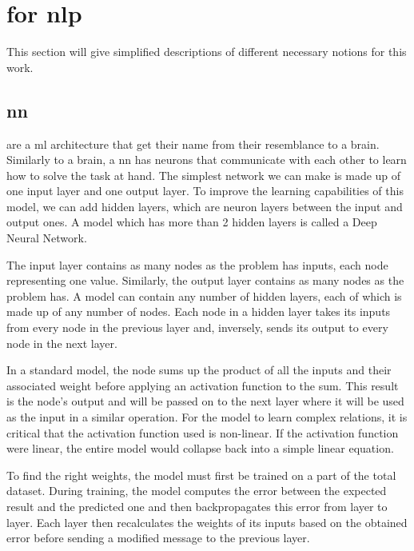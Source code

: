 \documentclass[../Document.tex]{subfiles}
\begin{document}
\section{ for \acrlong{nlp}}
\label{sec:intro/nlp}

This section will give simplified descriptions of different necessary notions for this work.


\subsection{\acrlong{nn}}

 are a \acrlong{ml} architecture that get their name from their resemblance to a brain. Similarly to a brain, a \gls{nn} has neurons that communicate with each other to learn how to solve the task at hand. The simplest network we can make is made up of one input layer and one output layer. To improve the learning capabilities of this model, we can add hidden layers, which are neuron layers between the input and output ones. A model which has more than 2 hidden layers is called a Deep Neural Network.

The input layer contains as many nodes as the problem has inputs, each node representing one value. Similarly, the output layer contains as many nodes as the problem has.
A model can contain any number of hidden layers, each of which is made up of any number of nodes. Each node in a hidden layer takes its inputs from every node in the previous layer and, inversely, sends its output to every node in the next layer.

In a standard model, the node sums up the product of all the inputs and their associated weight before applying an activation function to the sum. This result is the node's output and will be passed on to the next layer where it will be used as the input in a similar operation.
For the model to learn complex relations, it is critical that the activation function used is non-linear. If the activation function were linear, the entire model would collapse back into a simple linear equation.

To find the right weights, the model must first be trained on a part of the total dataset. During training, the model computes the error between the expected result and the predicted one and then backpropagates this error from layer to layer. Each layer then recalculates the weights of its inputs based on the obtained error before sending a modified message to the previous layer.
\end{document}
